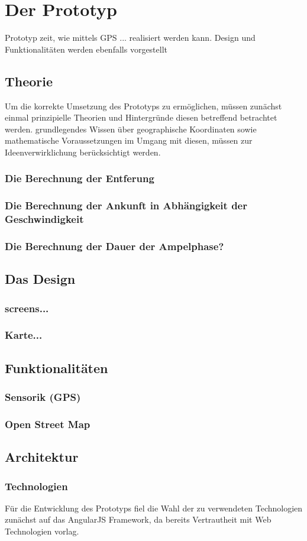 \chapter{Der Prototyp}
Prototyp zeit, wie mittels GPS ... realisiert werden kann.
Design und Funktionalitäten werden ebenfalls vorgestellt
\section{Theorie}
Um die korrekte Umsetzung des Prototyps zu ermöglichen, müssen zunächst einmal prinzipielle
Theorien und Hintergründe diesen betreffend betrachtet werden.
grundlegendes Wissen über geographische Koordinaten sowie mathematische Voraussetzungen im Umgang mit diesen, müssen zur Ideenverwirklichung berücksichtigt werden.
\subsection{Die Berechnung der Entferung}
\subsection{Die Berechnung der Ankunft in Abhängigkeit der Geschwindigkeit}
\subsection{Die Berechnung der Dauer der Ampelphase?}
\section{Das Design}
\subsection{screens... }
\subsection{Karte... }
\section{Funktionalitäten}
\subsection{Sensorik (GPS)}
\subsection{Open Street Map}
\section{Architektur}
\subsection{Technologien}
Für die Entwicklung des Prototyps fiel die Wahl der zu verwendeten Technologien zunächst auf
das AngularJS Framework, da bereits Vertrautheit mit Web Technologien vorlag.
